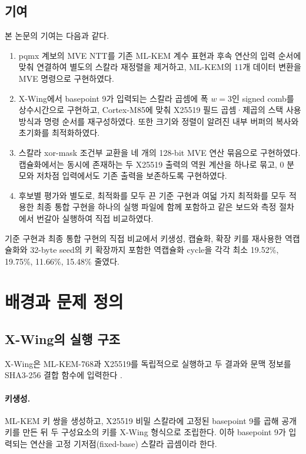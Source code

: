 \documentclass[runningheads,orivec]{llncs}
\newcommand{\xwing}{X-Wing}
\begin{document}
\subsection{기여}

본 논문의 기여는 다음과 같다.
\begin{enumerate}[leftmargin=*,itemsep=2pt]
\item pqmx 계보의 MVE NTT를 기존 ML-KEM 계수 표현과 후속 연산의 입력 순서에
      맞춰 연결하여 별도의 스칼라 재정렬을 제거하고, ML-KEM의 11개 데이터 변환을
      MVE 명령으로 구현하였다.
\item \xwing{}에서 basepoint 9가 입력되는 스칼라 곱셈에 폭 $w=3$인 signed comb를
      상수시간으로 구현하고, Cortex-M85에 맞춰 X25519 필드 곱셈·제곱의 스택 사용
      방식과 명령 순서를 재구성하였다. 또한 크기와 정렬이 알려진 내부 버퍼의 복사와
      초기화를 최적화하였다.
\item 스칼라 xor-mask 조건부 교환을 네 개의 128-bit MVE 연산 묶음으로 구현하였다.
      캡슐화에서는 동시에 존재하는 두 X25519 출력의 역원 계산을 하나로 묶고,
      0 분모와 저차점 입력에서도 기존 출력을 보존하도록 구현하였다.
\item 후보별 평가와 별도로, 최적화를 모두 끈 기준 구현과 여덟 가지 최적화를 모두
      적용한 최종 통합 구현을 하나의 실행 파일에 함께 포함하고 같은 보드와 측정
      절차에서 번갈아 실행하여 직접 비교하였다.
\end{enumerate}

기준 구현과 최종 통합 구현의 직접 비교에서 키생성, 캡슐화, 확장 키를 재사용한
역캡슐화와 32-byte seed의 키 확장까지 포함한 역캡슐화 cycle을 각각 최소
19.52\%, 19.75\%, 11.66\%, 15.48\% 줄였다.

\section{배경과 문제 정의}\label{sec:background}

\subsection{\xwing{}의 실행 구조}

\xwing{}은 ML-KEM-768과 X25519를 독립적으로 실행하고 두 결과와 문맥 정보를
SHA3-256 결합 함수에 입력한다 \cite{XWingDraft10,FIPS203,RFC7748}.

\paragraph{키생성.}
ML-KEM 키 쌍을 생성하고, X25519 비밀 스칼라에 고정된 basepoint 9를 곱해 공개키를
만든 뒤 두 구성요소의 키를 \xwing{} 형식으로 조립한다. 이하 basepoint 9가 입력되는
연산을 고정 기저점(fixed-base) 스칼라 곱셈이라 한다.
\end{document}
